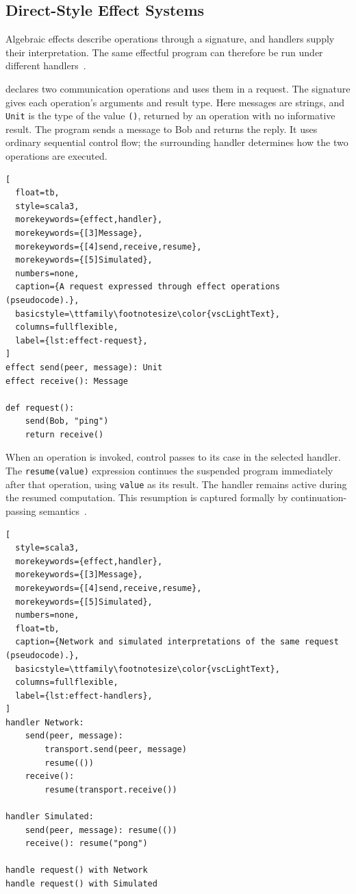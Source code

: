 \subsection{Direct-Style Effect Systems}
\label{subsec:direct-style-effect-systems}

Algebraic effects describe operations through a signature,
and handlers supply their interpretation.
The same effectful program can therefore be run under different handlers~\cite{plotkin2003algebraic,plotkin2009handlers}.

 declares two communication operations and uses them in a request.
The signature gives each operation's arguments and result type.
Here messages are strings,
and \texttt{Unit} is the type of the value \texttt{()},
returned by an operation with no informative result.
The program sends a message to Bob and returns the reply.
It uses ordinary sequential control flow;
the surrounding handler determines how the two operations are executed.

\begin{lstlisting}[
  float=tb,
  style=scala3,
  morekeywords={effect,handler},
  morekeywords={[3]Message},
  morekeywords={[4]send,receive,resume},
  morekeywords={[5]Simulated},
  numbers=none,
  caption={A request expressed through effect operations (pseudocode).},
  basicstyle=\ttfamily\footnotesize\color{vscLightText},
  columns=fullflexible,
  label={lst:effect-request},
]
effect send(peer, message): Unit
effect receive(): Message

def request():
    send(Bob, "ping")
    return receive()
\end{lstlisting}

When an operation is invoked,
control passes to its case in the selected handler.
The \texttt{resume(value)} expression continues the suspended program immediately after that operation,
using \texttt{value} as its result.
The handler remains active during the resumed computation.
This resumption is captured formally by continuation-passing semantics~\cite{Hillerström:2017}.

\begin{lstlisting}[
  style=scala3,
  morekeywords={effect,handler},
  morekeywords={[3]Message},
  morekeywords={[4]send,receive,resume},
  morekeywords={[5]Simulated},
  numbers=none,
  float=tb,
  caption={Network and simulated interpretations of the same request (pseudocode).},
  basicstyle=\ttfamily\footnotesize\color{vscLightText},
  columns=fullflexible,
  label={lst:effect-handlers},
]
handler Network:
    send(peer, message):
        transport.send(peer, message)
        resume(())
    receive():
        resume(transport.receive())

handler Simulated:
    send(peer, message): resume(())
    receive(): resume("pong")

handle request() with Network
handle request() with Simulated
\end{lstlisting}

